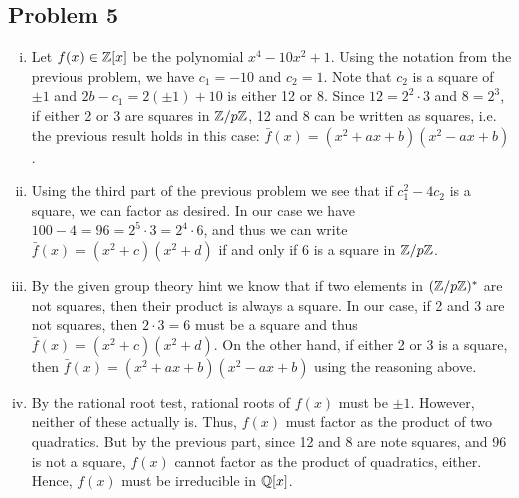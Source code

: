 \documentclass{../../mathnotes}
\begin{document}
\subsection*{Problem 5}

\begin{enumerate}[(i)]
    \item Let $f(x)\in\mathbb{Z}[x]$ be the polynomial $x^4-10x^2+1$. Using the notation from the previous problem, we have
        $c_1=-10$ and $c_2=1$. Note that $c_2$ is a square of $\pm 1$ and $2b-c_1=2(\pm1)+10$ is either 12 or 8.
        Since $12=2^2\cdot 3$ and $8=2^{3}$, if either 2 or 3 are squares in $\mathbb{Z}/p\mathbb{Z}$, 12 and 8 can be written as squares,
        i.e. the previous result holds in this case: $\bar f(x)=(x^2+ax+b)(x^2-ax+b)$.
    \item Using the third part of the previous problem we see that if $c_1^2-4c_2$ is a square, we can factor as desired.
        In our case we have $100-4=96=2^5\cdot 3=2^4\cdot 6$, and thus we can write $\bar f(x)=(x^2+c)(x^2+d)$ if and only if
        6 is a square in $\mathbb{Z}/p\mathbb{Z}$.
    \item By the given group theory hint we know that if two elements in $(\mathbb{Z}/p\mathbb{Z})^*$ are not squares, then their product is always a square.
        In our case, if 2 and 3 are not squares, then $2\cdot 3=6$ must be a square and thus $\bar f(x)=(x^2+c)(x^2+d)$. On the other hand,
        if either 2 or 3 is a square, then $\bar f(x)=(x^2+ax+b)(x^2-ax+b)$ using the reasoning above.
    \item By the rational root test, rational roots of $f(x)$ must be $\pm 1$. However, neither of these actually is.
        Thus, $f(x)$ must factor as the product of two quadratics. But by the previous part, since 12 and 8 are
        note squares, and 96 is not a square, $f(x)$ cannot factor as the product of quadratics, either. Hence,
        $f(x)$ must be irreducible in $\mathbb{Q}[x]$.
\end{enumerate}
\end{document}
